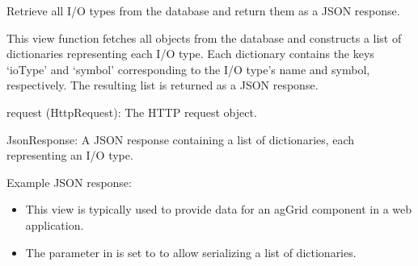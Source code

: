 \documentclass[letterpaper,10pt,english]{sphinxmanual}
\begin{document}

\begin{fulllineitems}
\label{\detokenize{app:app.views.get_iotypes}}
\pysigstartsignatures
{}
\pysigstopsignatures
\sphinxAtStartPar
Retrieve all I/O types from the database and return them as a JSON response.

\sphinxAtStartPar
This view function fetches all  objects from the database and constructs 
a list of dictionaries representing each I/O type. Each dictionary contains the 
keys ‘ioType’ and ‘symbol’ corresponding to the I/O type’s name and symbol, respectively. 
The resulting list is returned as a JSON response.
\begin{description}
\sphinxAtStartPar
request (HttpRequest): The HTTP request object.

\sphinxAtStartPar
JsonResponse: A JSON response containing a list of dictionaries, each representing an I/O type.

\sphinxAtStartPar
Example JSON response:

\begin{sphinxVerbatim}[commandchars=\\\{\}]
\PYG{p}{[}
\PYG{p}{]}
\end{sphinxVerbatim}

\begin{itemize}
\item {} 
\sphinxAtStartPar
This view is typically used to provide data for an ag\sphinxhyphen{}Grid component in a web application.

\item {} 
\sphinxAtStartPar
The  parameter in  is set to  to allow serializing a list of dictionaries.

\end{itemize}

\end{description}

\end{fulllineitems}
\end{document}
